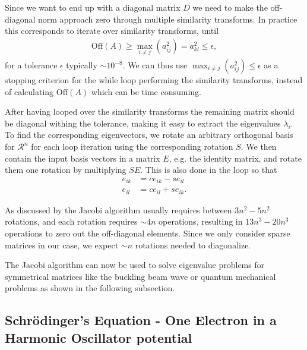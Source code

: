 \documentclass[twocolumn]{aastex62}
\begin{document}
Since we want to end up with a diagonal matrix $D$ we need to make the off-diagonal norm approach zero through multiple similarity transforms. In practice this corresponds to iterate over similarity transforms, until 
\begin{align}
\text{Off}(A) \geq \max_{i\neq j}(a_{ij}^2) = a_{kl}^2 \leq \epsilon,
\end{align}
for a tolerance $\epsilon$ typically $\sim 10^{-8}$. We can thus use 
$\max_{i\neq j}(a_{ij}^2)\leq \epsilon$ as a stopping criterion for the while loop performing the similarity transforms, instead of calculating $\text{Off}(A)$ which can be time consuming.

After having looped over the similarity transforms the remaining matrix should be diagonal withing the tolerance, making it easy to extract the eigenvalues $\lambda_i$. To find the corresponding eigenvectors, we rotate an arbitrary orthogonal basis for $\mathcal{R}^n$ for each loop iteration using the corresponding rotation $S$. We then contain the input basis vectors in a matrix $E$, e.g. the identity matrix, and rotate them one rotation by multiplying $SE$. This is also done in the loop so that 
\begin{align}
	e_{ik} &= ce_{ik} - se_{il}\\
	e_{il} &= ce_{il} + se_{ik}.
\end{align}

As discussed by \citep[p. 217]{Jensen:2015} the Jacobi algorithm usually requires between $3n^2-5n^2$ rotations, and each rotation requires $\sim 4n$ operations, resulting in $13n^3-20n^3$ operations to zero out the off-diagonal elements. Since we only consider sparse matrices in our case, we expect $\sim n$ rotations needed to diagonalize. 

The Jacobi algorithm can now be used to solve eigenvalue problems for symmetrical matrices like the buckling beam wave or quantum mechanical problems as shown in the following subsection. 

\subsection{Schrödinger's Equation - One Electron in a Harmonic Oscillator potential}
\end{document}
